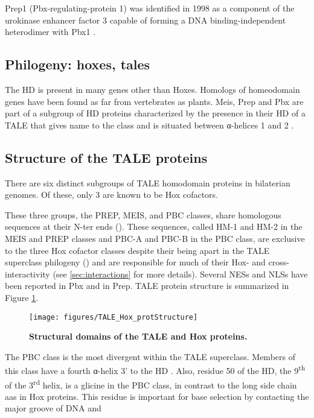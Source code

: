 Prep1 (Pbx-regulating-protein 1) was identified in 1998 as a component of the urokinase enhancer factor 3 capable of forming a DNA binding-independent heterodimer with Pbx1 \parencite{Berthelsen1998,Berthelsen1998a}.

\subsection{Philogeny: hoxes, tales}

The \ac{HD} is present in many genes other than Hoxes. Homologs of homeodomain genes have been found as far from vertebrates as plants. Meis, Prep and Pbx are part of a subgroup of \ac{HD} proteins characterized by the presence in their \ac{HD} of a \ac{TALE} that gives name to the class and is situated between α-helices 1 and 2 \parencite{Bertolino1995, Burglin1997, Mukherjee2007, Moens2006}. 

\subsection{Structure of the TALE proteins}

There are six distinct subgroups of \ac{TALE} homodomain proteins in bilaterian genomes. Of these, only 3 are known to be Hox cofactors. %

These three groups, the PREP, MEIS, and PBC classes, share homologous sequences at their \ac{N-ter} ends (\cite{Burglin1998}). These sequences, called HM-1 and HM-2 in the MEIS and PREP classes and PBC-A and PBC-B in the PBC class, are exclusive to the three Hox cofactor classes despite their being apart in the \ac{TALE} superclass philogeny (\cite{Mukherjee2007}) and are responsible for much of their Hox- and cross-interactivity (see \ref{sec:interactions} for more details). Several \acp{NES} and \acp{NLS} have been reported in Pbx and in Prep. \ac{TALE} protein structure is summarized in Figure \ref{fig:TALE_Hox_protStructure}.

\begin{figure}[]
  
  \centering
  \texttt{[image: figures/TALE\_Hox\_protStructure]}
  \caption[Structural domains of the TALE and Hox proteins]{\textbf{Structural domains of the TALE and Hox proteins.}}
  \label{fig:TALE_Hox_protStructure}
\end{figure}

The PBC class is the most divergent within the \ac{TALE} superclass. Members of this class have a fourth α-helix 3' to the \ac{HD} \parencite{Mukherjee2007}. Also, residue 50 of the \ac{HD}, the 9\textsuperscript{th} of the 3\textsuperscript{rd} helix, is a glicine in the PBC class, in contrast to the long side chain \acp{aa} in Hox proteins. This residue is important for base selection by contacting the major groove of DNA and  %

